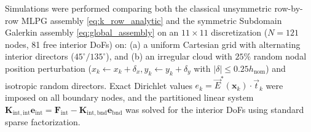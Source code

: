 \documentclass[preprint,12pt]{elsarticle}
\begin{document}
Simulations were performed comparing both the classical unsymmetric row-by-row MLPG assembly \eqref{eq:k_row_analytic} and the symmetric Subdomain Galerkin assembly \eqref{eq:global_assembly} on an $11 \times 11$ discretization ($N = 121$ nodes, 81 free interior DoFs) on: (a) a uniform Cartesian grid with alternating interior directors ($45^\circ / 135^\circ$), and (b) an irregular cloud with $25\%$ random nodal position perturbation ($x_k \gets x_k + \delta_x, y_k \gets y_k + \delta_y$ with $|\delta| \le 0.25 h_{\mathrm{nom}}$) and isotropic random directors. Exact Dirichlet values $e_k = \vec{E}^*(\mathbf{x}_k) \cdot \vec{t}_k$ were imposed on all boundary nodes, and the partitioned linear system $\mathbf{K}_{\mathrm{int}, \mathrm{int}} \mathbf{e}_{\mathrm{int}} = \mathbf{F}_{\mathrm{int}} - \mathbf{K}_{\mathrm{int}, \mathrm{bnd}} \mathbf{e}_{\mathrm{bnd}}$ was solved for the interior DoFs using standard sparse factorization.
\end{document}
